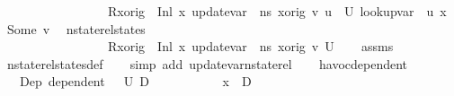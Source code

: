\begin{isabellebody}
\ \ \ \ \ \ \ \ \ \ \ \ \ \ \ {\isasymLambda}\ {\isasymLambda}{\isacharprime}{\kern0pt}\ {\isacharparenleft}{\kern0pt}R{\isacharparenleft}{\kern0pt}x{\isacharunderscore}{\kern0pt}orig\ {\isasymmapsto}\ {\isacharparenleft}{\kern0pt}Inl\ x{}{\isacharparenright}{\kern0pt}{\isacharparenright}{\kern0pt}{\isacharparenright}{\kern0pt}\ {\isacharparenleft}{\kern0pt}update{\isacharunderscore}{\kern0pt}var\ {\isasymLambda}\ ns\ x{\isacharunderscore}{\kern0pt}orig\ v{\isacharparenright}{\kern0pt}\ {\isacharbraceleft}{\kern0pt}u{\isacharprime}{\kern0pt}\ {\isasymin}\ U{\isachardot}{\kern0pt}\ lookup{\isacharunderscore}{\kern0pt}var\ {\isasymLambda}{\isacharprime}{\kern0pt}\ u{\isacharprime}{\kern0pt}\ x{}\ {\isacharequal}{\kern0pt}\ Some\ v{\isacharbraceright}{\kern0pt}{\isachardoublequoteclose}\isanewline
\ {\isacharparenleft}{\kern0pt}\ {\isachardoublequoteopen}nstate{\isacharunderscore}{\kern0pt}rel{\isacharunderscore}{\kern0pt}states\ \isanewline
\ \ \ \ \ \ \ \ \ \ \ \ \ \ \ {\isasymLambda}\ {\isasymLambda}{\isacharprime}{\kern0pt}\ {\isacharparenleft}{\kern0pt}R{\isacharparenleft}{\kern0pt}x{\isacharunderscore}{\kern0pt}orig\ {\isasymmapsto}\ {\isacharparenleft}{\kern0pt}Inl\ x{}{\isacharparenright}{\kern0pt}{\isacharparenright}{\kern0pt}{\isacharparenright}{\kern0pt}\ {\isacharparenleft}{\kern0pt}update{\isacharunderscore}{\kern0pt}var\ {\isasymLambda}\ ns\ x{\isacharunderscore}{\kern0pt}orig\ v{\isacharparenright}{\kern0pt}\ {\isacharquery}{\kern0pt}U{\isacharprime}{\kern0pt}{\isachardoublequoteclose}{\isacharparenright}{\kern0pt}\isanewline
%
\isadelimproof
\ \ %
\endisadelimproof
%
\isatagproof
{}\isamarkupfalse%
\ assms\isanewline
\ \ \isamarkupfalse%
\ nstate{\isacharunderscore}{\kern0pt}rel{\isacharunderscore}{\kern0pt}states{\isacharunderscore}{\kern0pt}def\isanewline
\ \ \isamarkupfalse%
\ {\isacharparenleft}{\kern0pt}simp\ add{\isacharcolon}{\kern0pt}\ update{\isacharunderscore}{\kern0pt}var{\isacharunderscore}{\kern0pt}nstate{\isacharunderscore}{\kern0pt}rel{\isacharparenright}{\kern0pt}%
\endisatagproof
{\isafoldproof}%
%
\isadelimproof
\ \ \isanewline
%
\endisadelimproof
\isanewline
{}\isamarkupfalse%
\ havoc{\isacharunderscore}{\kern0pt}dependent{\isacharcolon}{\kern0pt}\isanewline
\ \ \ Dep{\isacharcolon}{\kern0pt}\ {\isachardoublequoteopen}dependent\ {\isasymLambda}\ {\isasymOmega}\ U\ D{\isachardoublequoteclose}\ \isanewline
\ \ \ \ \ \ \ \ \ \ {\isachardoublequoteopen}x{}\ {\isasymnotin}\ D{\isachardoublequoteclose}\isanewline

\end{isabellebody}
